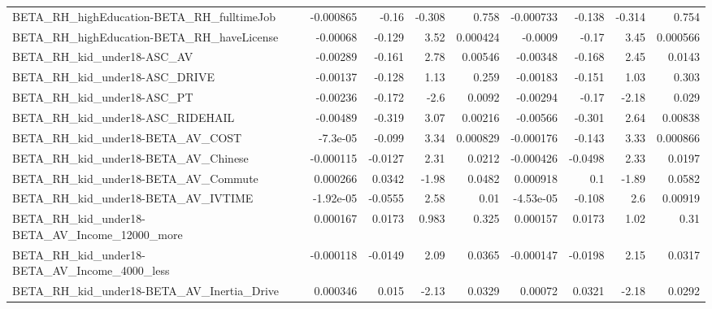 \begin{tabular}{lrrrrrrrr}
BETA\_RH\_highEducation-BETA\_RH\_fulltimeJob          &   -0.000865 &        -0.16 &   -0.308 &    0.758 &  -0.000733 &      -0.138 &       -0.314 &         0.754 \\
BETA\_RH\_highEducation-BETA\_RH\_haveLicense          &    -0.00068 &       -0.129 &     3.52 & 0.000424 &    -0.0009 &       -0.17 &         3.45 &      0.000566 \\
BETA\_RH\_kid\_under18-ASC\_AV                         &    -0.00289 &       -0.161 &     2.78 &  0.00546 &   -0.00348 &      -0.168 &         2.45 &        0.0143 \\
BETA\_RH\_kid\_under18-ASC\_DRIVE                      &    -0.00137 &       -0.128 &     1.13 &    0.259 &   -0.00183 &      -0.151 &         1.03 &         0.303 \\
BETA\_RH\_kid\_under18-ASC\_PT                         &    -0.00236 &       -0.172 &     -2.6 &   0.0092 &   -0.00294 &       -0.17 &        -2.18 &         0.029 \\
BETA\_RH\_kid\_under18-ASC\_RIDEHAIL                   &    -0.00489 &       -0.319 &     3.07 &  0.00216 &   -0.00566 &      -0.301 &         2.64 &       0.00838 \\
BETA\_RH\_kid\_under18-BETA\_AV\_COST                   &    -7.3e-05 &       -0.099 &     3.34 & 0.000829 &  -0.000176 &      -0.143 &         3.33 &      0.000866 \\
BETA\_RH\_kid\_under18-BETA\_AV\_Chinese                &   -0.000115 &      -0.0127 &     2.31 &   0.0212 &  -0.000426 &     -0.0498 &         2.33 &        0.0197 \\
BETA\_RH\_kid\_under18-BETA\_AV\_Commute                &    0.000266 &       0.0342 &    -1.98 &   0.0482 &   0.000918 &         0.1 &        -1.89 &        0.0582 \\
BETA\_RH\_kid\_under18-BETA\_AV\_IVTIME                 &   -1.92e-05 &      -0.0555 &     2.58 &     0.01 &  -4.53e-05 &      -0.108 &          2.6 &       0.00919 \\
BETA\_RH\_kid\_under18-BETA\_AV\_Income\_12000\_more      &    0.000167 &       0.0173 &    0.983 &    0.325 &   0.000157 &      0.0173 &         1.02 &          0.31 \\
BETA\_RH\_kid\_under18-BETA\_AV\_Income\_4000\_less       &   -0.000118 &      -0.0149 &     2.09 &   0.0365 &  -0.000147 &     -0.0198 &         2.15 &        0.0317 \\
BETA\_RH\_kid\_under18-BETA\_AV\_Inertia\_Drive          &    0.000346 &        0.015 &    -2.13 &   0.0329 &    0.00072 &      0.0321 &        -2.18 &        0.0292 \\

\end{tabular}
